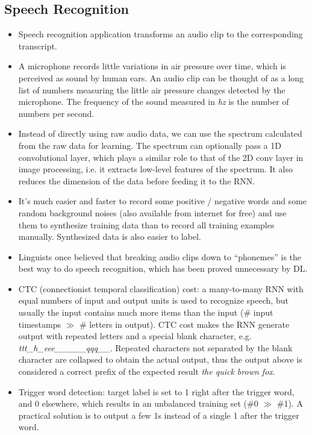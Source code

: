\subsection{Speech Recognition}
\begin{itemize}
  \item Speech recognition application transforms an audio clip to the corresponding transcript.
  \item A microphone records little variations in air pressure over time, which is perceived as sound by human ears. An audio clip can be thought of as a long list of numbers measuring the little air pressure changes detected by the microphone. The frequency of the sound measured in \textit{hz} is the number of numbers per second.
  \item Instead of directly using raw audio data, we can use the spectrum calculated from the raw data for learning. The spectrum can optionally pass a 1D convolutional layer, which plays a similar role to that of the 2D conv layer in image processing, i.e. it extracts low-level features of the spectrum. It also reduces the dimension of the data before feeding it to the RNN. 
  \item It's much easier and faster to record some positive / negative words and some random background noises (also available from internet for free) and use them to synthesize training data than to record all training examples manually. Synthesized data is also easier to label.
  \item Linguists once believed that breaking audio clips down to ``phonemes'' is the best way to do speech recognition, which has been proved unnecessary by DL.
  \item CTC (connectionist temporal classification) cost: a many-to-many RNN with equal numbers of input and output units is used to recognize speech, but usually the input contains much more items than the input (\# input timestamps $\gg$ \# letters in output). CTC cost makes the RNN generate output with repeated letters and a special blank character, e.g. \textit{ttt\_h\_eee\_\_\textvisiblespace\_\_\_qqq\_\_}. Repeated characters not separated by the blank character are collapsed to obtain the actual output, thus the output above is considered a correct prefix of the expected result \textit{the quick brown fox}.
  \item Trigger word detection: target label is set to 1 right after the trigger word, and 0 elsewhere, which results in an unbalanced training set (\#0 $\gg$ \#1). A practical solution is to output a few 1s instead of a single 1 after the trigger word.
\end{itemize}

\ifx\PREAMBLE\undefined

\fi